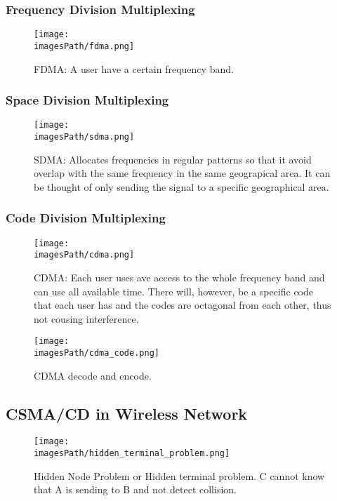 \subsubsection{Frequency Division Multiplexing}
\begin{figure}[H]
    \centering
    \texttt{[image: \\imagesPath/fdma.png]}
    \caption{FDMA: A user have a certain frequency band.}
\end{figure}

\subsubsection{Space Division Multiplexing}
\begin{figure}[H]
    \centering
    \texttt{[image: \\imagesPath/sdma.png]}
    \caption{SDMA: Allocates frequencies in regular patterns so that it avoid overlap with the same frequency in the same geograpical area.
    It can be thought of only sending the signal to a specific geographical area.}
\end{figure}

\subsubsection{Code Division Multiplexing}
\begin{figure}[H]
    \centering
    \texttt{[image: \\imagesPath/cdma.png]}
    \caption{CDMA: Each user uses ave access to the whole frequency band and can use all available time.
    There will, however, be a specific code that each user has and the codes are octagonal from each other, thus not cousing interference.}
\end{figure}

\begin{figure}[H]
    \centering
    \texttt{[image: \\imagesPath/cdma\_code.png]}
    \caption{CDMA decode and encode.}
\end{figure}


\subsection{CSMA/CD in Wireless Network}
\begin{figure}[H]
    \centering
    \texttt{[image: \\imagesPath/hidden\_terminal\_problem.png]}
    \caption{Hidden Node Problem or Hidden terminal problem. C cannot know that A is sending to B and not detect collision.}
\end{figure}

